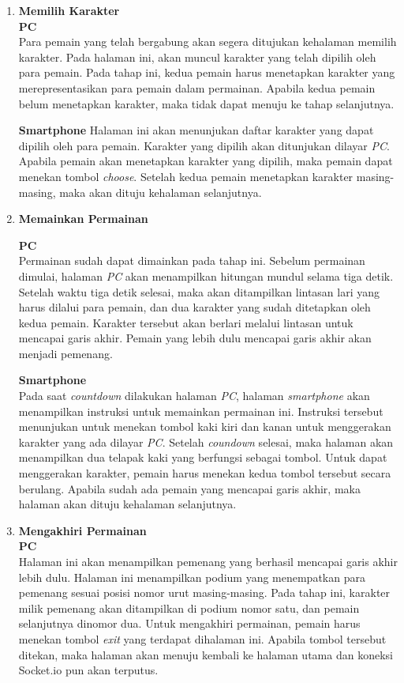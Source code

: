 \begin{enumerate}
	\item \textbf{Memilih Karakter} \\
	
	\textbf{PC} \\
	Para pemain yang telah bergabung akan segera ditujukan kehalaman memilih karakter. Pada halaman ini, akan muncul karakter yang telah dipilih oleh para pemain. Pada tahap ini, kedua pemain harus menetapkan karakter yang merepresentasikan para pemain dalam permainan. Apabila kedua pemain belum menetapkan karakter, maka tidak dapat menuju ke tahap selanjutnya.
	
	\textbf{Smartphone}
	Halaman ini akan menunjukan daftar karakter yang dapat dipilih oleh para pemain. Karakter yang dipilih akan ditunjukan dilayar \textit{PC}. Apabila pemain akan menetapkan karakter yang dipilih, maka pemain dapat menekan tombol \textit{choose}. Setelah kedua pemain menetapkan karakter masing-masing, maka akan dituju kehalaman selanjutnya.
	
	\item \textbf{Memainkan Permainan}
	
	\textbf{PC} \\
	Permainan sudah dapat dimainkan pada tahap ini. Sebelum permainan dimulai, halaman \textit{PC} akan menampilkan hitungan mundul selama tiga detik. Setelah waktu tiga detik selesai, maka akan ditampilkan lintasan lari yang harus dilalui para pemain, dan dua karakter yang sudah ditetapkan oleh kedua pemain. Karakter tersebut akan berlari melalui lintasan untuk mencapai garis akhir. Pemain yang lebih dulu mencapai garis akhir akan menjadi pemenang.
	
	\textbf{Smartphone} \\
	Pada saat \textit{countdown} dilakukan halaman \textit{PC}, halaman \textit{smartphone} akan menampilkan instruksi untuk memainkan permainan ini. Instruksi tersebut menunjukan untuk menekan tombol kaki kiri dan kanan untuk menggerakan karakter yang ada dilayar \textit{PC}. Setelah \textit{coundown} selesai, maka halaman akan menampilkan dua telapak kaki yang berfungsi sebagai tombol. Untuk dapat menggerakan karakter, pemain harus menekan kedua tombol tersebut secara berulang. Apabila sudah ada pemain yang mencapai garis akhir, maka halaman akan dituju kehalaman selanjutnya.
	
	\item \textbf{Mengakhiri Permainan} \\
	
	\textbf{PC} \\
	Halaman ini akan menampilkan pemenang yang berhasil mencapai garis akhir lebih dulu. Halaman ini menampilkan podium yang menempatkan para pemenang sesuai posisi nomor urut masing-masing. Pada tahap ini, karakter milik pemenang akan ditampilkan di podium nomor satu, dan pemain selanjutnya dinomor dua. Untuk mengakhiri permainan, pemain harus menekan tombol \textit{exit} yang terdapat dihalaman ini. Apabila tombol tersebut ditekan, maka halaman akan menuju kembali ke halaman utama dan koneksi Socket.io pun akan terputus.
	

\end{enumerate}
